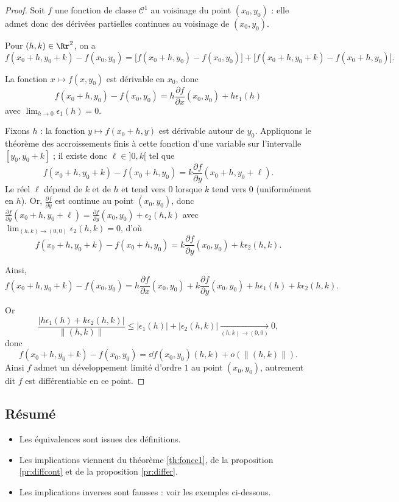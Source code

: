 \begin{proof}
	Soit $f$ une fonction de classe $\mathcal{C}^1$ au voisinage du point $(x_0,y_0)$ : elle admet donc des dérivées partielles continues au voisinage de $(x_0,y_0)$. 
	
	
	Pour $(h,k)\in \Rr^2$, on a
	$$f(x_0+h,y_0+k)-f(x_0,y_0)=\big[f(x_0+h,y_0)-f(x_0,y_0)\big]
	+\big[f(x_0+h,y_0+k)-f(x_0+h,y_0)\big].$$
	
	La fonction $x\mapsto f(x,y_0)$ est dérivable en $x_0$, donc $$f(x_0+h,y_0)-f(x_0,y_0)=h\frac{\partial f}{\partial x}(x_0,y_0)+ h\epsilon_1(h)$$
	avec $\lim _{h\to 0}\epsilon _1(h)=0$.
	
	Fixons $h$ : la fonction $y\mapsto f(x_0+h,y)$ est dérivable autour de $y_0$. Appliquons le théorème des accroissements finis à cette fonction d'une variable sur l'intervalle $[y_0,y_0+k]$ ; il existe donc $\ell \in {}]0,k[$ tel que 
	$$f(x_0+h,y_0+k)-f(x_0+h,y_0) = k \frac{\partial f}{\partial y}(x_0+h,y_0+\ell).$$
	Le réel $\ell$ dépend de $k$ et de $h$ et tend vers $0$ lorsque $k$ tend vers $0$ (uniformément en $h$).
	Or, $\frac{\partial f}{\partial y}$ est continue au point $(x_0,y_0)$, donc $\frac{\partial f}{\partial y}(x_0+h,y_0+\ell)=\frac{\partial f}{\partial y}(x_0,y_0)+\epsilon_2(h,k)$ avec $\lim _{(h,k)\to (0,0)}\epsilon_2(h,k)=0$,
	d'où
	$$f(x_0+h,y_0+k)-f(x_0+h,y_0)=k\frac{\partial f}{\partial y}(x_0,y_0)+k\epsilon _2(h,k).$$
	
	Ainsi, 
	$$f(x_0+h,y_0+k)-f(x_0,y_0)=h\frac{\partial f}{\partial x}(x_0,y_0)+k\frac{\partial f}{\partial y}(x_0,y_0)+h\epsilon _1(h)+k\epsilon _2(h,k).$$
	
	Or
	$$\frac{|h\epsilon _1(h)+k\epsilon _2(h,k)|}{\|(h,k)\|}\le |\epsilon _1(h)|+|\epsilon _2(h,k)| \xrightarrow[(h,k)\to(0,0)]{} 0,$$
	donc
	$$f(x_0+h,y_0+k)-f(x_0,y_0)=\dd f (x_0,y_0)(h,k)+o\left(\|(h,k)\|\right).$$
	Ainsi $f$ admet un développement limité d'ordre $1$ au point $(x_0,y_0)$, autrement dit $f$ est différentiable en ce point.
\end{proof}



\subsection{Résumé}



\begin{itemize}
	\item Les équivalences sont issues des définitions.
	\item Les implications viennent du théorème \ref{th:foncc1}, de la proposition \ref{pr:diffcont} et de la proposition \ref{pr:differ}.
	\item Les implications inverses sont fausses : voir les exemples ci-dessous.
\end{itemize}



